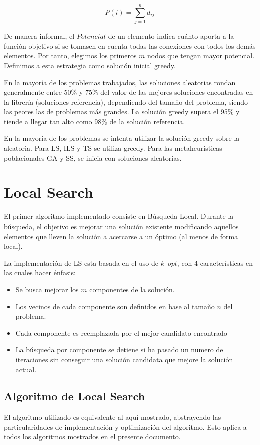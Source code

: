 \documentclass{ci5652}
\begin{document}
$$P(i)=\sum_{j=1}^{n}d_{ij}$$

De manera informal, el $Potencial$ de un elemento indica cuánto aporta a la función objetivo si se tomasen en cuenta todas las conexiones con todos los demás elementos. Por tanto, elegimos los primeros $m$ nodos que tengan mayor potencial. Definimos a esta estrategia como solución inicial greedy.

En la mayoría de los problemas trabajados, las soluciones aleatorias rondan generalmente entre 50\% y 75\% del valor de las mejores soluciones encontradas en la librería (soluciones referencia), dependiendo del tamaño del problema, siendo las peores las de problemas más grandes. La solución greedy supera el 95\% y tiende a llegar tan alto como 98\% de la solución referencia.

En la mayoría de los problemas se intenta utilizar la solución greedy sobre la aleatoria. Para LS, ILS y TS se utiliza greedy. Para las metaheurísticas poblacionales GA y SS, se inicia con soluciones aleatorias.

\section{Local Search}
El primer algoritmo implementado consiste en Búsqueda Local. Durante la búsqueda, el objetivo es mejorar una solución existente modificando aquellos elementos que lleven la solución a acercarse a un óptimo (al menos de forma local).

La implementación de LS esta basada en el uso de $k\text{--}opt$, con 4 características en las cuales hacer énfasis:
\begin{itemize} \itemsep5pt
	\item Se busca mejorar los $m$ componentes de la solución.
	\item Los vecinos de cada componente son definidos en base al tamaño $n$ del problema.
	\item Cada componente es reemplazada por el mejor candidato encontrado
	\item La búsqueda por componente se detiene si ha pasado un numero de iteraciones sin conseguir una solución candidata que mejore la solución actual.
\end{itemize}

\subsection{Algoritmo de Local Search}
El algoritmo utilizado es equivalente al aquí mostrado, abstrayendo las particularidades de implementación y optimización del algoritmo. Esto aplica a todos los algoritmos mostrados en el presente documento.
\end{document}
